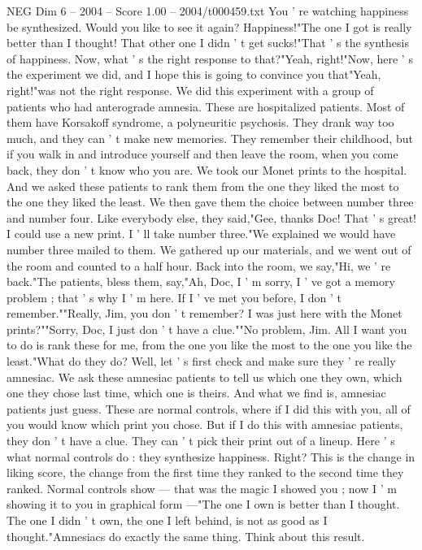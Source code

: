\begin{textsample}{NEG Dim 6 – 2004 – Score 1.00 – 2004/t000459.txt}
You ' re watching happiness be synthesized.
Would you like to see it again?
Happiness!"The one I got is really better than I thought!
That other one I didn ' t get sucks!"That ' s the synthesis of happiness.
Now, what ' s the right response to that?"Yeah, right!"Now, here ' s the experiment we did, and I hope this is going to convince you that"Yeah, right!"was not the right response.
We did this experiment with a group of patients who had anterograde amnesia.
These are hospitalized patients.
Most of them have Korsakoff syndrome, a polyneuritic psychosis.
They drank way too much, and they can ' t make new memories.
They remember their childhood, but if you walk in and introduce yourself and then leave the room, when you come back, they don ' t know who you are.
We took our Monet prints to the hospital.
And we asked these patients to rank them from the one they liked the most to the one they liked the least.
We then gave them the choice between number three and number four.
Like everybody else, they said,"Gee, thanks Doc!
That ' s great!
I could use a new print.
I ' ll take number three."We explained we would have number three mailed to them.
We gathered up our materials, and we went out of the room and counted to a half hour.
Back into the room, we say,"Hi, we ' re back."The patients, bless them, say,"Ah, Doc, I ' m sorry, I ' ve got a memory problem ; that ' s why I ' m here.
If I ' ve met you before, I don ' t remember.""Really, Jim, you don ' t remember?
I was just here with the Monet prints?""Sorry, Doc, I just don ' t have a clue.""No problem, Jim.
All I want you to do is rank these for me, from the one you like the most to the one you like the least."What do they do?
Well, let ' s first check and make sure they ' re really amnesiac.
We ask these amnesiac patients to tell us which one they own, which one they chose last time, which one is theirs.
And what we find is, amnesiac patients just guess.
These are normal controls, where if I did this with you, all of you would know which print you chose.
But if I do this with amnesiac patients, they don ' t have a clue.
They can ' t pick their print out of a lineup.
Here ' s what normal controls do : they synthesize happiness.
Right?
This is the change in liking score, the change from the first time they ranked to the second time they ranked.
Normal controls show — that was the magic I showed you ; now I ' m showing it to you in graphical form —"The one I own is better than I thought.
The one I didn ' t own, the one I left behind, is not as good as I thought."Amnesiacs do exactly the same thing.
Think about this result.

\end{textsample}
